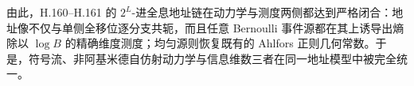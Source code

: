 \noindent
由此，H.160--H.161 的 \(2^L\)-进全息地址链在动力学与测度两侧都达到严格闭合：地址像不仅与单侧全移位逐分支共轭，而且任意 Bernoulli 事件源都在其上诱导出熵除以 \(\log B\) 的精确维度测度；均匀源则恢复既有的 Ahlfors 正则几何常数。于是，符号流、非阿基米德自仿射动力学与信息维数三者在同一地址模型中被完全统一。

\endinput
